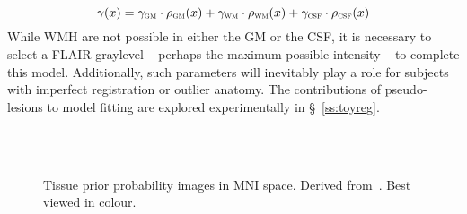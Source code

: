 \begin{equation}
  \gamma(x) = \gamma_{\textsc{gm}{}}\cdot\rho_{\textsc{gm}{}}(x)
            + \gamma_{\textsc{wm}{}}\cdot\rho_{\textsc{wm}{}}(x)
            + \gamma_{\textsc{csf}{}}\cdot\rho_{\textsc{csf}{}}(x)
\end{equation}
While WMH are not possible in either the GM or the CSF,
it is necessary to select a FLAIR graylevel
-- perhaps the maximum possible intensity --
to complete this model.
Additionally, such parameters will inevitably play a role
for subjects with imperfect registration or outlier anatomy.
The contributions of pseudo-lesions to model fitting
are explored experimentally in \S~\ref{ss:toyreg}.
\begin{figure}
  \centering
  \\[0.5em]
  \\[0.5em]
  \caption{Tissue prior probability images in MNI space.
    Derived from~\cite{Mazziotta2001}. Best viewed in colour.}%
  \label{fig:tpm-3}
\end{figure}
